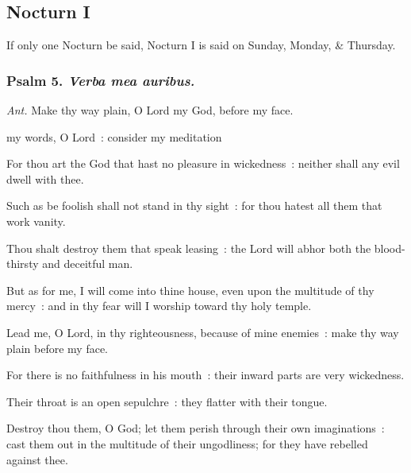 \vspace{-1ex}

\subsection{Nocturn I}\par
\begin{rubric}
    {If only one Nocturn be said, Nocturn I is said on Sunday, Monday, \& Thursday.}
\end{rubric}

\vspace{-1ex}

\subsubsection{Psalm 5. \textit{Verba mea auribus.}}\par\noindent
\textit{Ant.} Make thy way plain, {\dag} O Lord my God, before my face.\par
{} my words, O Lord~: consider my meditation\par
{}
For thou art the God that hast no pleasure in wickedness~: neither shall any evil dwell with thee.\par
{}Such as be foolish shall not stand in thy sight~: for thou hatest all them that work vanity.\par
{}Thou shalt destroy them that speak leasing~: the Lord will abhor both the blood-thirsty and deceitful man.\par
{}But as for me, I will come into thine house, even upon the multitude of thy mercy~: and in thy fear will I worship toward thy holy temple.\par
{}Lead me, O Lord, in thy righteousness, because of mine enemies~: make thy way plain before my face.\par
{}For there is no faithfulness in his mouth~: their inward parts are very wickedness.\par
{}Their throat is an open sepulchre~: they flatter with their tongue.\par
{}Destroy thou them, O God; let them perish through their own imaginations~: cast them out in the multitude of their ungodliness; for they have rebelled against thee.\par
